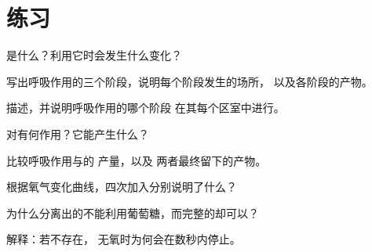 \section{练习}

\begin{exercise}[$\star$]\label{exo:g12:respiration-fermentation:1}
 是什么？利用它时会发生什么变化？
\end{exercise}

\begin{exercise}[$\star$]\label{exo:g12:respiration-fermentation:2}
写出呼吸作用的三个阶段，说明每个阶段发生的场所，
以及各阶段的产物。
\end{exercise}

\begin{exercise}[$\star$]\label{exo:g12:respiration-fermentation:3}
描述，并说明呼吸作用的哪个阶段
在其每个区室中进行。
\end{exercise}

\begin{exercise}[$\star$]\label{exo:g12:respiration-fermentation:4}
对有何作用？它能产生什么？
\end{exercise}

\begin{exercise}[$\star$]\label{exo:g12:respiration-fermentation:5}
比较呼吸作用与的  产量，以及
两者最终留下的产物。
\end{exercise}

\begin{exercise}[$\star\star$]\label{exo:g12:respiration-fermentation:6}
根据氧气变化曲线，四次加入分别说明了什么？
\end{exercise}

\begin{exercise}[$\star\star$]\label{exo:g12:respiration-fermentation:7}
为什么分离出的不能利用葡萄糖，而完整的却可以？
\end{exercise}

\begin{exercise}[$\star\star$]\label{exo:g12:respiration-fermentation:8}
解释：若不存在，
无氧时为何会在数秒内停止。
\end{exercise}

